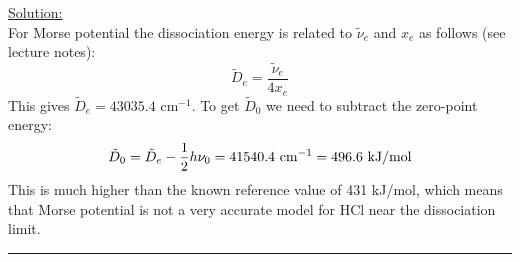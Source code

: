 \noindent
\underline{Solution:}\\

\noindent
For Morse potential the dissociation energy is related to $\tilde{\nu}_e$ and $x_e$ as follows (see lecture notes):
$$\tilde{D}_e = \frac{\tilde{\nu}_e}{4x_e}$$
This gives $\tilde{D}_e = 43035.4$ cm$^{-1}$. To get $\tilde{D}_0$ we need to subtract the zero-point energy:
$$\tilde{D}_0 = \tilde{D}_e - \frac{1}{2}h\nu_0 = 41540.4\textnormal{ cm}^{-1} = 496.6\textnormal{ kJ/mol}$$
This is much higher than the known reference value of 431 kJ/mol, which means that Morse potential is not a very accurate model for HCl near the dissociation limit.

\hrule\vspace{0.5cm}



